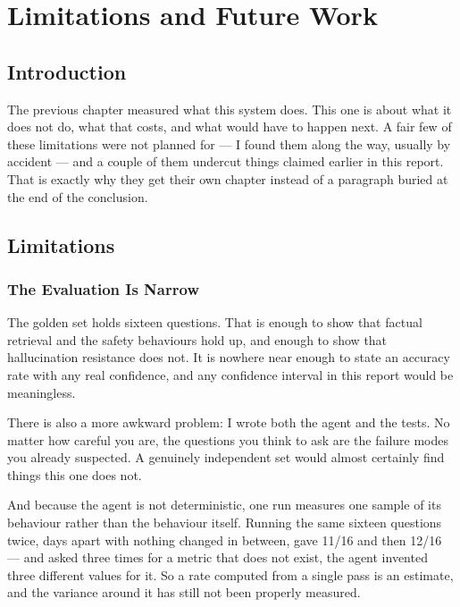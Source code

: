 \chapter{Limitations and Future Work}\label{ch:limits}

\section*{Introduction}

The previous chapter measured what this system does. This one is about what it
does not do, what that costs, and what would have to happen next. A fair few of
these limitations were not planned for --- I found them along the way, usually
by accident --- and a couple of them undercut things claimed earlier in this
report. That is exactly why they get their own chapter instead of a paragraph
buried at the end of the conclusion.

\section{Limitations}

\subsection{The Evaluation Is Narrow}

The golden set holds sixteen questions. That is enough to show that factual
retrieval and the safety behaviours hold up, and enough to show that
hallucination resistance does not. It is nowhere near enough to state an
accuracy rate with any real confidence, and any confidence interval in this
report would be meaningless.

There is also a more awkward problem: I wrote both the agent and the tests. No
matter how careful you are, the questions you think to ask are the failure modes
you already suspected. A genuinely independent set would almost certainly find
things this one does not.

And because the agent is not deterministic, one run measures one sample of its
behaviour rather than the behaviour itself. Running the same sixteen questions
twice, days apart with nothing changed in between, gave 11/16 and then 12/16 ---
and asked three times for a metric that does not exist, the agent invented three
different values for it. So a rate computed from a single pass is an estimate,
and the variance around it has still not been properly measured.

